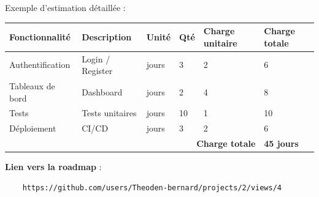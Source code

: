 \begin{for_you}{Exemple d'estimation détaillée :}
    \begin{longtable}{p{3cm}p{3.2cm}p{0.9cm}p{0.6cm}p{1.6cm}p{1.7cm}}
    \toprule
    \textbf{Fonctionnalité} & \textbf{Description} & \textbf{Unité} & \textbf{Qté} & \textbf{Charge unitaire} & \textbf{Charge totale} \\
    \midrule
    Authentification & Login / Register & jours & 3 & 2 & 6 \\
    Tableaux de bord & Dashboard & jours & 2 & 4 & 8 \\
    Tests & Tests unitaires & jours & 10 & 1 & 10 \\
    Déploiement & CI/CD & jours & 3 & 2 & 6 \\
    \midrule
    \multicolumn{5}{r}{\textbf{Charge totale}} & \textbf{45 jours} \\
    \bottomrule
    \end{longtable}

    \textbf{\newline Lien vers la roadmap} :
    \begin{verbatim}
    https://github.com/users/Theoden-bernard/projects/2/views/4
    \end{verbatim}
    
\end{for_you}